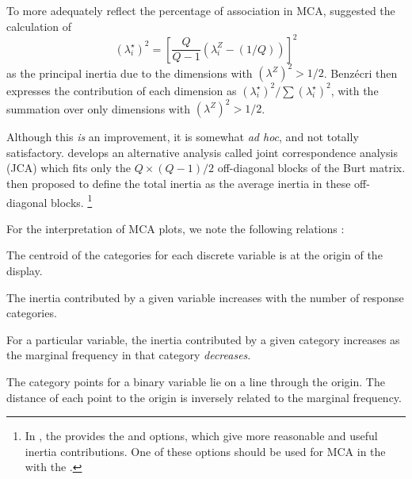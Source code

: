 To more adequately reflect the percentage of association in MCA,
\citet{Benzecri:77} suggested the calculation of
\begin{equation*}%
(\lambda_i^{\star})^2 =
{\left[ \frac{Q}{Q-1} ( \lambda_i^Z - (1/Q) ) \right]}^2
\end{equation*}
as the principal inertia due to the dimensions with $(\lambda^Z)^2 > 1/2$.
Benz{\'e}cri then expresses the contribution of each dimension as
$ (\lambda_i^{\star})^2 / \sum (\lambda_i^{\star})^2$,
with the summation over only dimensions with $(\lambda^Z)^2 > 1/2$.

Although this \emph{is} an improvement, it is somewhat \emph{ad hoc},
and not totally satisfactory.
\citet{Greenacre:88} develops an alternative analysis
called joint correspondence analysis (JCA)
which fits only the $Q \times (Q-1) /2$ off-diagonal blocks
of the Burt matrix.
\citet{Greenacre:90} then proposed to define the total inertia
as the average inertia in these off-diagonal blocks.%
\footnote{In , the  provides the
 and  options, which give more
reasonable and useful inertia contributions.
One of these options should be used for MCA in the 
with the .
}

For the interpretation of MCA plots, we note the following relations
\citep[\S 5.2]{Greenacre:84}:
\begin{itemize*}
\item The centroid of the categories for each discrete variable
is at the origin of the display.
\item The inertia contributed by a given variable increases with the
number of response categories.
\item For a particular variable,
the inertia contributed by a given category increases as the marginal
frequency in that category \emph{decreases}.
\item The category points for a binary variable lie on a line
through the origin.  The distance of each point to the origin is
inversely related to the marginal frequency.
\end{itemize*}

